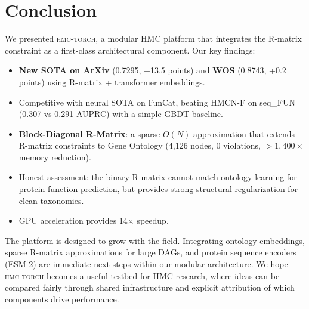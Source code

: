 \documentclass[11pt,a4paper]{article}
\begin{document}
\section{Conclusion}

We presented \textsc{hmc-torch}, a modular HMC platform that integrates
the R-matrix constraint as a first-class architectural component. Our
key findings:

\begin{itemize}[leftmargin=*,nosep]
  \item \textbf{New SOTA on ArXiv} (0.7295, +13.5 points) and
    \textbf{WOS} (0.8743, +0.2 points) using R-matrix + transformer
    embeddings.
  \item Competitive with neural SOTA on FunCat, beating HMCN-F on
    seq\_FUN (0.307 vs 0.291 AUPRC) with a simple GBDT baseline.
  \item \textbf{Block-Diagonal R-Matrix}: a sparse $O(N)$ approximation
    that extends R-matrix constraints to Gene Ontology (4,126 nodes,
    0 violations, $>1{,}400\times$ memory reduction).
  \item Honest assessment: the binary R-matrix cannot match ontology
    learning for protein function prediction, but provides strong
    structural regularization for clean taxonomies.
  \item GPU acceleration provides 14$\times$ speedup.
\end{itemize}

The platform is designed to grow with the field. Integrating ontology
embeddings, sparse R-matrix approximations for large DAGs, and protein
sequence encoders (ESM-2) are immediate next steps within our modular
architecture. We hope \textsc{hmc-torch} becomes a useful testbed for
HMC research, where ideas can be compared fairly through shared
infrastructure and explicit attribution of which components drive
performance.

\end{document}
